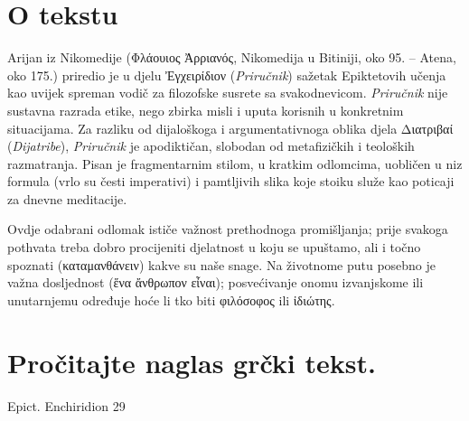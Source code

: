 

\section*{O tekstu}

Arijan iz Nikomedije \textgreek[variant=ancient]{(Φλάουιος Ἀρριανός,} Nikomedija u Bitiniji, oko 95. – Atena, oko 175.) priredio je u djelu \textgreek[variant=ancient]{Ἐγχειρίδιον} (\textit{Priručnik}) sažetak Epiktetovih učenja kao uvijek spreman vodič za filozofske susrete sa svakodnevicom. \textit{Priručnik} nije sustavna razrada etike, nego zbirka misli i uputa korisnih u konkretnim situacijama. Za razliku od dijaloškoga i argumentativnoga oblika djela \textgreek[variant=ancient]{Διατριβαί} (\textit{Dijatribe}), \textit{Priručnik} je apodiktičan, slobodan od metafizičkih i teoloških razmatranja. Pisan je fragmentarnim stilom, u kratkim odlomcima, uobličen u niz formula (vrlo su česti imperativi) i pamtljivih slika koje stoiku služe kao poticaji za dnevne meditacije.

Ovdje odabrani odlomak ističe važnost prethodnoga promišljanja; prije svakoga pothvata treba dobro procijeniti djelatnost u koju se upuštamo, ali i točno spoznati \textgreek[variant=ancient]{(καταμανθάνειν)} kakve su naše snage. Na životnome putu posebno je važna dosljednost \textgreek[variant=ancient]{(ἕνα ἄνθρωπον εἶναι)}; posvećivanje onomu izvanjskome ili unutarnjemu određuje hoće li tko biti \textgreek[variant=ancient]{φιλόσοφος} ili \textgreek[variant=ancient]{ἰδιώτης.}

\newpage

\section*{Pročitajte naglas grčki tekst.}

Epict. Enchiridion 29


\medskip


